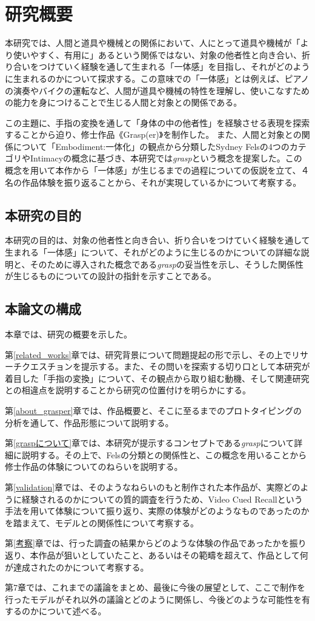 \chapter{研究概要}
\label{introduction}
本研究では、人間と道具や機械との関係において、人にとって道具や機械が「より使いやすく、有用に」あるという関係ではない、対象の他者性と向き合い、折り合いをつけていく経験を通して生まれる「一体感」を目指し、それがどのように生まれるのかについて探求する。この意味での「一体感」とは例えば、ピアノの演奏やバイクの運転など、人間が道具や機械の特性を理解し、使いこなすための能力を身につけることで生じる人間と対象との関係である。

この主題に、手指の変換を通して「身体の中の他者性」を経験させる表現を探索することから迫り、修士作品《Grasp(er)》を制作した。
また、人間と対象との関係について「Embodiment:一体化」の観点から分類したSydney Felsの4つのカテゴリやIntimacyの概念に基づき、本研究では\textit{grasp}という概念を提案した。この概念を用いて本作から「一体感」が生じるまでの過程についての仮説を立て、４名の作品体験を振り返ることから、それが実現しているかについて考察する。

\section{本研究の目的}
本研究の目的は、対象の他者性と向き合い、折り合いをつけていく経験を通して生まれる「一体感」について、それがどのように生じるのかについての詳細な説明と、そのために導入された概念である\textit{grasp}の妥当性を示し、そうした関係性が生じるものについての設計の指針を示すことである。

\section{本論文の構成}
本章では、研究の概要を示した。

第\ref{related_works}章では、研究背景について問題提起の形で示し、その上でリサーチクエスチョンを提示する。また、その問いを探索する切り口として本研究が着目した「手指の変換」について、その観点から取り組む動機、そして関連研究との相違点を説明することから研究の位置付けを明らかにする。

第\ref{about_grasper}章では、作品概要と、そこに至るまでのプロトタイピングの分析を通して、作品形態について説明する。

第\ref{graspについて}章では、本研究が提示するコンセプトである\textit{grasp}について詳細に説明する。その上で、Felsの分類との関係性と、この概念を用いることから修士作品の体験についてのねらいを説明する。

第\ref{validation}章では、そのようなねらいのもと制作された本作品が、実際どのように経験されるのかについての質的調査を行うため、Video Cued Recallという手法を用いて体験について振り返り、実際の体験がどのようなものであったのかを踏まえて、モデルとの関係性について考察する。

第\ref{考察}章では、行った調査の結果からどのような体験の作品であったかを振り返り、本作品が狙いとしていたこと、あるいはその範疇を超えて、作品として何が達成されたのかについて考察する。

第7章では、これまでの議論をまとめ、最後に今後の展望として、ここで制作を行ったモデルがそれ以外の議論とどのように関係し、今後どのような可能性を有するのかについて述べる。